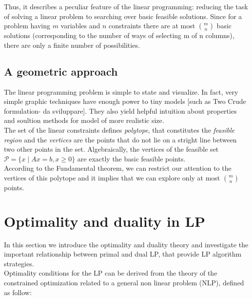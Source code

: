 \documentclass[a4paper,10 pt,titlepage,twoside]{book}
\theoremstyle{plain}
\theoremstyle{definition}
\newtheorem{ex}[thm]{Example}
\theoremstyle{remark}
\begin{document}
Thus, it describes a peculiar feature of the linear programming: reducing the task of solving a linear problem to searching over basic feasible solutions. Since for a problem having $m$ variables and $n$ constraints there are at most ${m}\choose{n}$ basic solutions (corresponding to the number of ways of selecting m of n columns), there are only a finite number of possibilities. 

\subsection*{A geometric approach}
The linear programming problem is simple to state and visualize. In fact, very simple graphic techniques have enough power to tiny models [such as Two Crude formulation- da sviluppare]. They also yield helpful intuition about properties and soultion methods for model of more realistic size.\\ The set of the linear constraints defines  \textit{polytope}, that constitutes the \textit{feasible region} and the \textit{vertices} are the points that do not lie on a stright line between two other points in the set. Algebraically, the vertices of the feasible set $\mathcal{P}=\lbrace x\; |\; Ax = b , x \geq0\rbrace$ are exactly the basic feasible points.\\ According to the Fundamental theorem, we can restrict our attention to the vertices of this polytope and it implies that we can explore only at most  ${m}\choose{n}$ points. 

\section{Optimality and duality in LP}
In this section we introduce the optimality and duality theory and investigate the important relationship between primal and dual LP, that provide LP algorithm strategies.\\ 
Optimality conditions for the LP can be derived from the theory of the constrained optimization related to a general non linear problem (NLP), defined as follow:
\end{document}

